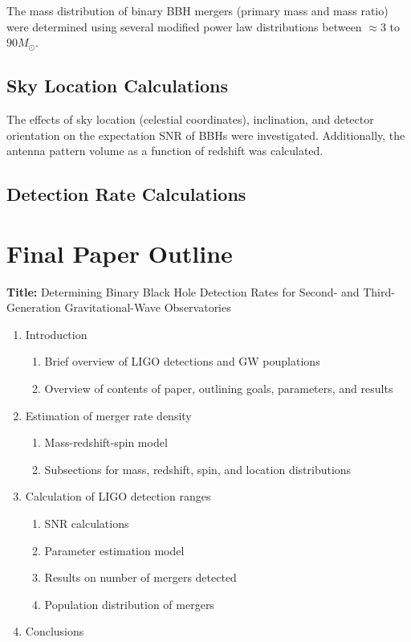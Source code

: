 \documentclass[10pt]{article}
\begin{document}
\begin{multicols*}{2}
The mass distribution of binary BBH mergers (primary mass and mass ratio) were determined using several modified power law distributions between $\approx 3$ to $90 M_\odot$. 

\subsection{Sky Location Calculations}

The effects of sky location (celestial coordinates), inclination, and detector orientation on the expectation SNR of BBHs were investigated. Additionally, the antenna pattern volume as a function of redshift was calculated.

\subsection{Detection Rate Calculations}



\section{Final Paper Outline}

\textbf{Title:} Determining Binary Black Hole Detection Rates for Second- and Third-Generation Gravitational-Wave Observatories

\begin{enumerate}
    \setlength{\itemsep}{0pt}
    \item Introduction
    \begin{enumerate}
        \item Brief overview of LIGO detections and GW pouplations 
        \item Overview of contents of paper, outlining goals, parameters, and results
    \end{enumerate}
    \item Estimation of merger rate density
    \begin{enumerate}
        \item Mass-redshift-spin model
        \item Subsections for mass, redshift, spin, and location distributions
    \end{enumerate}
    \item Calculation of LIGO detection ranges
    \begin{enumerate}
        \item SNR calculations
        \item Parameter estimation model
        \item Results on number of mergers detected
        \item Population distribution of mergers
    \end{enumerate}
    \item Conclusions
\end{enumerate}


\end{multicols*}
\end{document}
